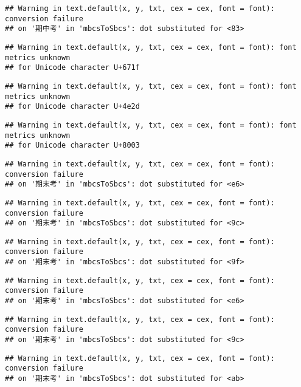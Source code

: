 \documentclass[
]{book}
\begin{document}
\begin{verbatim}
## Warning in text.default(x, y, txt, cex = cex, font = font): conversion failure
## on '期中考' in 'mbcsToSbcs': dot substituted for <83>
\end{verbatim}

\begin{verbatim}
## Warning in text.default(x, y, txt, cex = cex, font = font): font metrics unknown
## for Unicode character U+671f
\end{verbatim}

\begin{verbatim}
## Warning in text.default(x, y, txt, cex = cex, font = font): font metrics unknown
## for Unicode character U+4e2d
\end{verbatim}

\begin{verbatim}
## Warning in text.default(x, y, txt, cex = cex, font = font): font metrics unknown
## for Unicode character U+8003
\end{verbatim}

\begin{verbatim}
## Warning in text.default(x, y, txt, cex = cex, font = font): conversion failure
## on '期末考' in 'mbcsToSbcs': dot substituted for <e6>
\end{verbatim}

\begin{verbatim}
## Warning in text.default(x, y, txt, cex = cex, font = font): conversion failure
## on '期末考' in 'mbcsToSbcs': dot substituted for <9c>
\end{verbatim}

\begin{verbatim}
## Warning in text.default(x, y, txt, cex = cex, font = font): conversion failure
## on '期末考' in 'mbcsToSbcs': dot substituted for <9f>
\end{verbatim}

\begin{verbatim}
## Warning in text.default(x, y, txt, cex = cex, font = font): conversion failure
## on '期末考' in 'mbcsToSbcs': dot substituted for <e6>
\end{verbatim}

\begin{verbatim}
## Warning in text.default(x, y, txt, cex = cex, font = font): conversion failure
## on '期末考' in 'mbcsToSbcs': dot substituted for <9c>
\end{verbatim}

\begin{verbatim}
## Warning in text.default(x, y, txt, cex = cex, font = font): conversion failure
## on '期末考' in 'mbcsToSbcs': dot substituted for <ab>
\end{verbatim}
\end{document}
